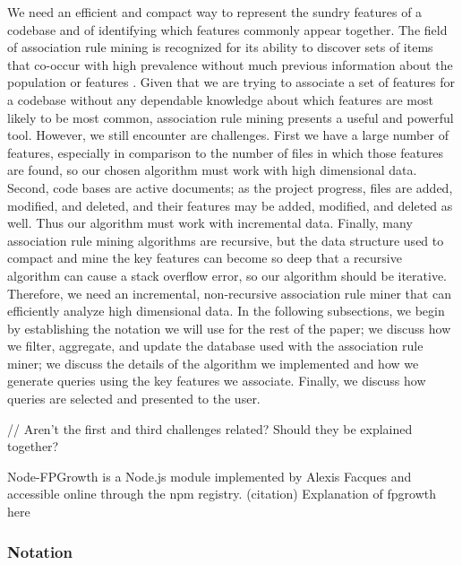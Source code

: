 \documentclass[12pt]{article}
\begin{document}
We need an efficient and compact way to represent the sundry features of a codebase and of identifying which features commonly appear together. The field of association rule mining is recognized for its ability to discover sets of items that co-occur with high prevalence without much previous information about the population or features \cite{AiEtAl2018}. Given that we are trying to associate a set of features for a codebase without any dependable knowledge about which features are most likely to be most common, association rule mining presents a useful and powerful tool. However, we still encounter are challenges. First we have a large number of features, especially in comparison to the number of files in which those features are found, so our chosen algorithm must work with high dimensional data. Second, code bases are active documents; as the project progress, files are added, modified, and deleted, and their features may be added, modified, and deleted as well. Thus our algorithm must work with incremental data. Finally, many association rule mining algorithms are recursive, but the data structure used to compact and mine the key features can become so deep that a recursive algorithm can cause a stack overflow error, so our algorithm should be iterative. Therefore, we need an incremental, non-recursive association rule miner that can efficiently analyze high dimensional data. In the following subsections, we begin by establishing the notation we will use for the rest of the paper; we discuss how we filter, aggregate, and update the database used with the association rule miner; we discuss the details of the algorithm we implemented and how we generate queries using the key features we associate. Finally, we discuss how queries are selected and presented to the user.

// Aren't the first and third challenges related? Should they be explained together?

Node-FPGrowth is a Node.js module implemented by Alexis Facques and accessible online through the npm registry. (citation) Explanation of fpgrowth here

\subsubsection{Notation}
\end{document}
